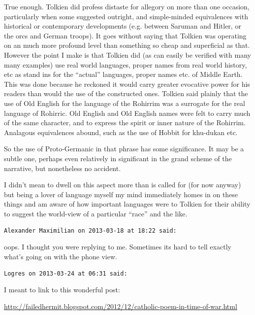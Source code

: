 \begin{footnotesize}
\begin{sffamily}
True enough. Tolkien did profess distaste for allegory on more than one occasion, particularly when some suggested outright, and simple-minded equivalences with historical or contemporary developments (e.g. between Saruman and Hitler, or the orcs and German troops). It goes without saying that Tolkien was operating on an much more profound level than something so cheap and superficial as that. However the point I make is that Tolkien did (as can easily be verified with many many examples) use real world languages, proper names from real world history, etc as stand ins for the ``actual'' languages, proper names etc. of Middle Earth. This was done because he reckoned it would carry greater evocative power for his readers than would the use of the constructed ones. Tolkien said plainly that the use of Old English for the language of the Rohirrim was a surrogate for the real language of Rohirric. Old English and Old English names were felt to carry much of the same character, and to express the spirit or inner nature of the Rohirrim. Analagous equivalences abound, such as the use of Hobbit for khu-dukan etc.

So the use of Proto-Germanic in that phrase has some significance. It may be a subtle one, perhaps even relatively in significant in the grand scheme of the narrative, but nonetheless no accident.

I didn't mean to dwell on this aspect more than is called for (for now anyway) but being a lover of language myself my mind immediately homes in on these things and am aware of how important languages were to Tolkien for their ability to suggest the world-view of a particular ``race'' and the like.

\hfill

\texttt{Alexander Maximilian on 2013-03-18 at 18:22 said:}

oops. I thought you were replying to me. Sometimes its hard to tell exactly what's going on with the phone view.

\hfill

\texttt{Logres on 2013-03-24 at 06:31 said:}

I meant to link to this wonderful post:


\url{http://failedhermit.blogspot.com/2012/12/catholic-poem-in-time-of-war.html}

\hfill

\end{sffamily}
\end{footnotesize}

